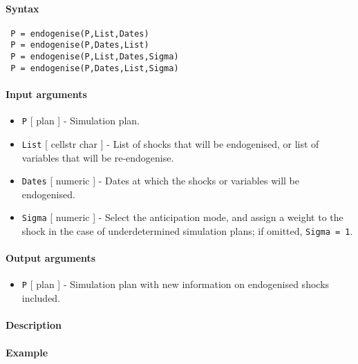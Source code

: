 


	\paragraph{Syntax}
 
 \begin{verbatim}
 P = endogenise(P,List,Dates)
 P = endogenise(P,Dates,List)
 P = endogenise(P,List,Dates,Sigma)
 P = endogenise(P,Dates,List,Sigma)
 \end{verbatim}
 
 \paragraph{Input arguments}
 
 \begin{itemize}
 \item
   \texttt{P} {[} plan {]} - Simulation plan.
 \item
   \texttt{List} {[} cellstr \textbar{} char {]} - List of shocks that
   will be endogenised, or list of variables that will be re-endogenise.
 \item
   \texttt{Dates} {[} numeric {]} - Dates at which the shocks or
   variables will be endogenised.
 \item
   \texttt{Sigma} {[} numeric {]} - Select the anticipation mode, and
   assign a weight to the shock in the case of underdetermined simulation
   plans; if omitted, \texttt{Sigma = 1}.
 \end{itemize}
 
 \paragraph{Output arguments}
 
 \begin{itemize}
 \item
   \texttt{P} {[} plan {]} - Simulation plan with new information on
   endogenised shocks included.
 \end{itemize}
 
 \paragraph{Description}
 
 \paragraph{Example}


